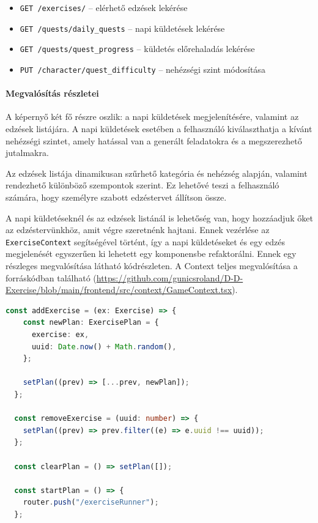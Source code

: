 \documentclass[
]{thesis-ekf}
\theoremstyle{definition}
\theoremstyle{remark}
\begin{document}
\begin{itemize}
    \item \texttt{GET /exercises/} – elérhető edzések lekérése
    \item \texttt{GET /quests/daily\_quests} – napi küldetések lekérése
    \item \texttt{GET /quests/quest\_progress} – küldetés előrehaladás lekérése
    \item \texttt{PUT /character/quest\_difficulty} – nehézségi szint módosítása
\end{itemize}

\paragraph{Megvalósítás részletei}

A képernyő két fő részre oszlik: a napi küldetések megjelenítésére, valamint az edzések listájára. A napi küldetések esetében a felhasználó kiválaszthatja a kívánt nehézségi szintet, amely hatással van a generált feladatokra és a megszerezhető jutalmakra.

Az edzések listája dinamikusan szűrhető kategória és nehézség alapján, valamint rendezhető különböző szempontok szerint. Ez lehetővé teszi a felhasználó számára, hogy személyre szabott edzéstervet állítson össze.

A napi küldetéseknél és az edzések listánál is lehetőség van, hogy hozzáadjuk őket az edzéstervünkhöz, amit végre szeretnénk hajtani. Ennek vezérlése az \texttt{ExerciseContext} segítségével történt, így a napi küldetéseket és egy edzés megjelenését egyszerűen ki lehetett egy komponensbe refaktorálni. Ennek egy részleges megvalósítása látható  kódrészleten. A Context teljes megvalósítása a forráskódban található (\url{https://github.com/gunicsroland/D-D-Exercise/blob/main/frontend/src/context/GameContext.tsx}).

\begin{lstlisting}[language=TypeScript, style=typescriptstyle, caption={Exercise Context az edzésterv kezelése (részlet)}, label={code_exercise_context}]
    const addExercise = (ex: Exercise) => {
    const newPlan: ExercisePlan = {
      exercise: ex,
      uuid: Date.now() + Math.random(),
    };

    setPlan((prev) => [...prev, newPlan]);
  };

  const removeExercise = (uuid: number) => {
    setPlan((prev) => prev.filter((e) => e.uuid !== uuid));
  };

  const clearPlan = () => setPlan([]);

  const startPlan = () => {
    router.push("/exerciseRunner");
  };
\end{lstlisting}
\end{document}
